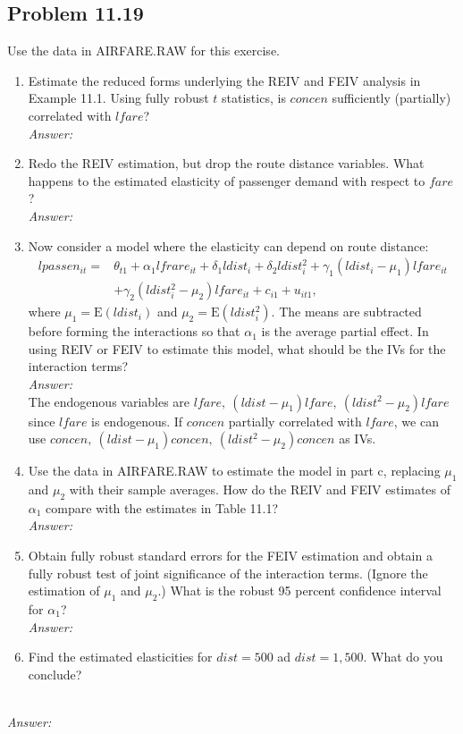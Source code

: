 \documentclass[10pt]{article}
\newcommand{\E}{\text{E}}
\begin{document}
\subsection*{Problem 11.19}
Use the data in AIRFARE.RAW for this exercise.
\begin{enumerate}[label=\alph*.]
\item Estimate the reduced forms underlying the REIV and FEIV analysis in Example 11.1. Using fully robust $t$ statistics, is $concen$ sufficiently (partially) correlated with $lfare$?
\\ \textit{Answer:}\\

\item Redo the REIV estimation, but drop the route distance variables. What happens to the estimated elasticity of passenger demand with respect to $fare$?
\\ \textit{Answer:}\\

\item Now consider a model where the elasticity can depend on route distance:
\begin{align*}
    lpassen_{it}=&\theta_{t1}+\alpha_1 lfrare_{it}+\delta_1 ldist_i+\delta_2 ldist_i^2+\gamma_1(ldist_i-\mu_1)lfare_{it}\\
    &+\gamma_2(ldist_i^2-\mu_2)lfare_{it}+c_{i1}+u_{it1},
\end{align*}
where $\mu_1=\E(ldist_i)$ and $\mu_2=\E(ldist_i^2)$. The means are subtracted before forming the interactions so that $\alpha_1$ is the average partial effect. In using REIV or FEIV to estimate this model, what should be the IVs for the interaction terms?
\\ \textit{Answer:}\\
The endogenous variables are $lfare,\ (ldist-\mu_1)lfare,\ (ldist^2-\mu_2)lfare$ since $lfare$ is endogenous. If $concen$ partially correlated with $lfare$, we can use $concen,\ (ldist-\mu_1)concen,\ (ldist^2-\mu_2)concen$ as IVs.

\item Use the data in AIRFARE.RAW to estimate the model in part c, replacing $\mu_1$ and $\mu_2$ with their sample averages. How do the REIV and FEIV estimates of $\alpha_1$ compare with the estimates in Table 11.1?
\\ \textit{Answer:}\\

\item Obtain fully robust standard errors for the FEIV estimation and obtain a fully robust test of joint significance of the interaction terms. (Ignore the estimation of $\mu_1$ and $\mu_2$.) What is the robust 95 percent confidence interval for $\alpha_1$?
\\ \textit{Answer:}\\

\item Find the estimated elasticities for $dist=500$ ad $dist=1,500.$ What do you conclude?
\end{enumerate}
\\ \textit{Answer:}\\
\end{document}
